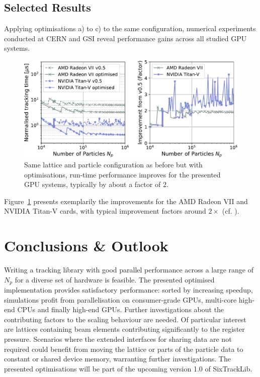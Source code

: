 \documentclass[a4paper,
               refpage,       %
               keeplastbox,   %
               ]{jacow}
\begin{document}
\subsection{Selected Results}
Applying optimisations a) to c) to the same configuration, numerical experiments conducted at CERN and GSI reveal performance gains across all studied GPU systems.
\begin{figure}[h!bt]
    \centering 
    \includegraphics*[width=\columnwidth]{fig_performance_optimisation}
    \caption{Same lattice and particle configuration as before but with optimisations, run-time performance improves for the presented GPU systems, typically by about a factor of $2$.}
    \label{fig:optimised_performance}
\end{figure}
Figure~\ref{fig:optimised_performance} presents exemplarily the improvements for the AMD Radeon VII and NVIDIA Titan-V cards, with typical improvement factors around $2\times$ (cf. \cite{data-2021}).

\section{Conclusions \& Outlook}
Writing a tracking library with good parallel performance across a large range of $N_{p}$ for a diverse set of hardware is feasible. The presented optimised implementation provides satisfactory performance:
sorted by increasing speedup, simulations profit from parallelisation on consumer-grade GPUs, multi-core high-end CPUs and finally high-end GPUs. 
Further investigations about the contributing factors to the scaling behaviour are needed. Of particular interest are lattices containing beam elements contributing significantly to the register pressure. Scenarios where the extended interfaces for sharing data are not required could benefit from moving the lattice or parts of the particle data to constant or shared device memory, warranting further investigations. The presented optimisations will be part of the upcoming version 1.0 of SixTrackLib.
\end{document}
